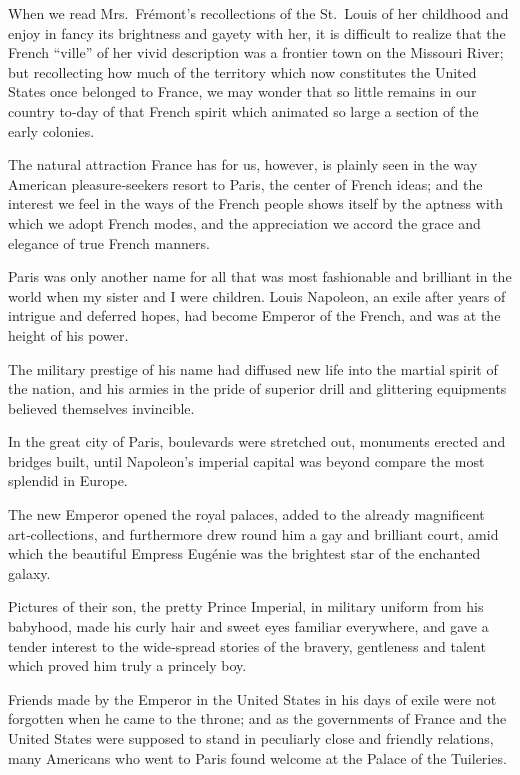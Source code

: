 \documentclass[12pt]{book}
\begin{document}
When we read Mrs.~Frémont’s recollections of the St.~Louis of her childhood
and enjoy in fancy its brightness and gayety with her, it is difficult to realize that
the French “ville” of her vivid description was a frontier town on the Missouri
River; but recollecting how much of the territory which now constitutes the
United States once belonged to France, we may wonder that so little remains in
our country to‐day of that French spirit which animated so large a section of the
early colonies.

The natural attraction France has for us, however, is plainly seen in the way
American pleasure‐seekers resort to Paris, the center of French ideas; and the
interest we feel in the ways of the French people shows itself by the aptness with
which we adopt French modes, and the appreciation we accord the grace and
elegance of true French manners.

Paris was only another name for all that was most fashionable and brilliant
in the world when my sister and I were children. Louis Napoleon, an exile after
years of intrigue and deferred hopes, had become Emperor of the French, and
was at the height of his power.

The military prestige of his name had diffused new life into the martial spirit of
the nation, and his armies in the pride of superior drill and glittering equipments
believed themselves invincible.

In the great city of Paris, boulevards were stretched out, monuments erected
and bridges built, until Napoleon’s imperial capital was beyond compare the most
splendid in Europe.

The new Emperor opened the royal palaces, added to the already magnificent
art‐collections, and furthermore drew round him a gay and brilliant court, amid
which the beautiful Empress Eugénie was the brightest star of the enchanted
galaxy.

Pictures of their son, the pretty Prince Imperial, in military uniform from his
babyhood, made his curly hair and sweet eyes familiar everywhere, and gave a
tender interest to the wide‐spread stories of the bravery, gentleness and talent
which proved him truly a princely boy.

Friends made by the Emperor in the United States in his days of exile were not
forgotten when he came to the throne; and as the governments of France and the
United States were supposed to stand in peculiarly close and friendly relations,
many Americans who went to Paris found welcome at the Palace of the Tuileries.
\end{document}
